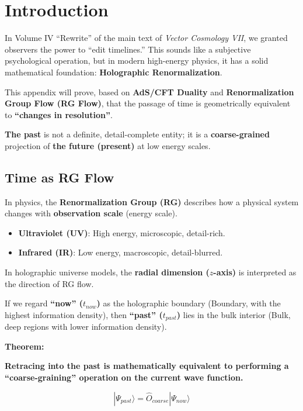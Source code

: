 \section{Introduction}

In Volume IV ``Rewrite'' of the main text of \textit{Vector Cosmology VII}, we granted observers the power to ``edit timelines.'' This sounds like a subjective psychological operation, but in modern high-energy physics, it has a solid mathematical foundation: \textbf{Holographic Renormalization}.

This appendix will prove, based on \textbf{AdS/CFT Duality} and \textbf{Renormalization Group Flow (RG Flow)}, that the passage of time is geometrically equivalent to \textbf{``changes in resolution''}.

\textbf{The past} is not a definite, detail-complete entity; it is a \textbf{coarse-grained} projection of \textbf{the future (present)} at low energy scales.

\subsection{Time as RG Flow}

In physics, the \textbf{Renormalization Group (RG)} describes how a physical system changes with \textbf{observation scale} (energy scale).

\begin{itemize}
\item \textbf{Ultraviolet (UV)}: High energy, microscopic, detail-rich.

\item \textbf{Infrared (IR)}: Low energy, macroscopic, detail-blurred.
\end{itemize}

In holographic universe models, the \textbf{radial dimension ($z$-axis)} is interpreted as the direction of RG flow.

If we regard \textbf{``now'' ($t_{now}$)} as the holographic boundary (Boundary, with the highest information density), then \textbf{``past'' ($t_{past}$)} lies in the bulk interior (Bulk, deep regions with lower information density).

\textbf{Theorem:}

\textbf{Retracing into the past is mathematically equivalent to performing a ``coarse-graining'' operation on the current wave function.}

\[|\Psi_{past}\rangle = \hat{O}_{coarse} |\Psi_{now}\rangle\]

